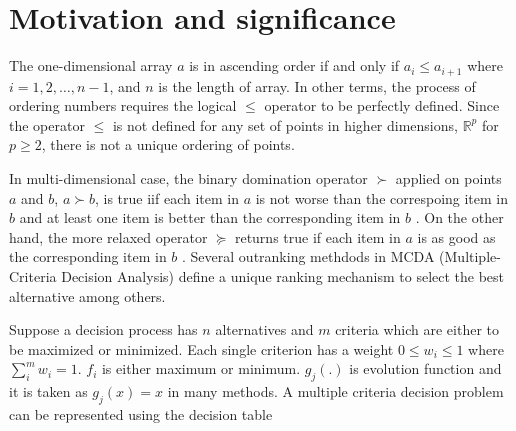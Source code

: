 \documentclass[preprint,review, 12pt, a4paper]{elsarticle}
\begin{document}
\section{Motivation and significance}
\label{section::Motivation_and_Significance}


The one-dimensional array $a$ is in ascending order if and only if $a_i \le a_{i+1}$ where $i = 1, 2, \dots, n-1$, and $n$ is the length of array. In other terms, the process of ordering numbers requires the logical $\le$ operator to be perfectly defined. Since the operator $\le$ is not defined for any set of points in higher dimensions, $\mathbb{R}^p$ for $p \ge 2$, there is not a unique ordering of points.

In multi-dimensional case, the binary domination operator $\succ$ applied on points $a$ and $b$, $a \succ b$, is true iif each item in $a$ is not worse than the correspoing item in $b$ and at least one item is better than the corresponding item in $b$ \cite{Deb_2002}. On the other hand, the more relaxed operator $\succeq$ returns true if each item in $a$ is as good as the corresponding item in $b$ \cite{greco2016multiple}. Several outranking methdods in MCDA (Multiple-Criteria Decision Analysis) define a unique ranking mechanism to select the best alternative among others.

Suppose a decision process has $n$ alternatives and $m$ criteria  which are either to be maximized or minimized. Each single criterion has a weight $0 \le w_i \le 1$ where $\sum_i^m w_i = 1$. $f_i$ is either maximum or minimum. $g_j(.)$ is evolution function and it is taken as $g_j(x) = x$ in many methods. A multiple criteria decision problem can be represented using the decision table 
\end{document}
